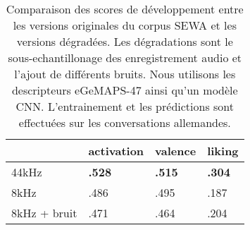 \begin{table}[htp!]
   \centering
   \begin{tabular}{|l| l  l  l|}
       \hline
                   &activation    &valence   &liking \\
       \hline
       44kHz           &\textbf{.528}  &\textbf{.515} &\textbf{.304} \\
       8kHz            &.486 &.495 &.187 \\
       8kHz + bruit    &.471 &.464 &.204 \\
       \hline
   \end{tabular}
   \caption{Comparaison des scores de développement entre les versions originales du corpus SEWA et les versions dégradées. Les dégradations sont le sous-echantillonage des enregistrement audio et l'ajout de différents bruits. Nous utilisons les descripteurs eGeMAPS-47 ainsi qu'un modèle CNN. L'entrainement et les prédictions sont effectuées sur les conversations allemandes.}
   \label{tab:downsample}
\end{table}
